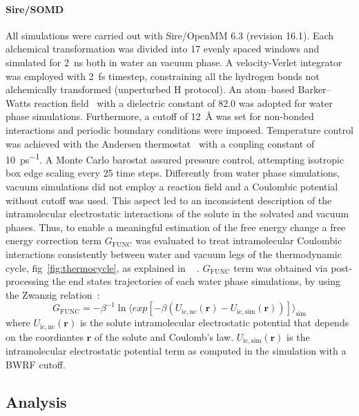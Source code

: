 \documentclass[journal=jctcce,manuscript=article]{achemso}
\begin{document}
\paragraph{Sire/SOMD} All simulations were carried out with
Sire/OpenMM 6.3 (revision 16.1).  Each alchemical transformation was
divided into 17 evenly spaced windows and simulated for \SI{2}{ns}
both in water an vacuum phase. A velocity-Verlet integrator was
employed with \SI{2}{fs} timestep, constraining all the hydrogen bonds
not alchemically transformed (unperturbed H protocol). An atom--based
Barker--Watts reaction field~\cite{doi:10.1080/00268977300102101} with
a dielectric constant of \num{82.0} was adopted for water phase
simulations. Furthermore, a cutoff of \SI{12}{\angstrom} was set for non-bonded
interactions and periodic boundary conditions were imposed.
Temperature control was achieved with the Andersen
thermostat~\cite{doi:10.1063/1.439486} with a coupling constant of
\SI{10}{ps^{-1}}.  A Monte Carlo barostat assured pressure control,
attempting isotropic box edge scaling every 25 time steps.
Differently from water phase simulations, vacuum simulations did not employ
a reaction field and a Coulombic potential without cutoff was used.
This aspect led to an inconsistent description of the intramolecular electrostatic interactions
of the solute in the solvated and vacuum phases.
Thus, to enable a meaningful estimation of the free energy change 
a free energy correction term $G_{\mathrm{FUNC}}$ was
evaluated to treat intramolecular Coulombic interactions consistently
between water and vacuum legs of the thermodynamic cycle, fig~\ref{fig:thermocycle}, as explained
in ~\cite{Bosisio2016} . $G_{\mathrm{FUNC}}$ term was obtained
via post-processing the end states trajectories of each water
phase simulations, by using the Zwanzig relation~\cite{zwanzig_high-temperature_1954}:
\begin{equation}
 \label{eq:ZwanzigDGfunc}
 G_{\mathrm{FUNC}} = -\beta^{-1} \ln \langle exp \left[-\beta(U_{\mathrm{ic,nc}}(\mathbf{r}) - U_{\mathrm{ic,sim}}(\mathbf{r}))\right]\rangle_{\mathrm{sim}}
\end{equation}
where $U_{\mathrm{ic,nc}}(\mathbf{r})$ is the solute intramolecular electrostatic 
potential that depends on the coordiantes $\mathbf{r}$ of the solute and Coulomb's law. 
$U_{\mathrm{ic,sim}}(\mathbf{r})$ is the intramolecular electrostatic potential term as
computed in the simulation with a BWRF cutoff. 


\subsection{Analysis}
\label{sec:analysis}
\end{document}
